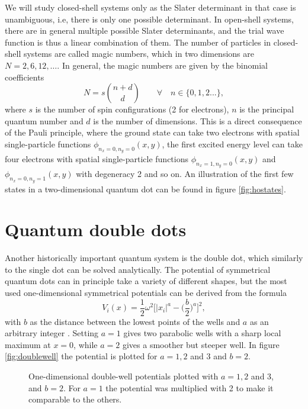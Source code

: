 We will study closed-shell systems only as the Slater determinant in that case is unambiguous, i.e, there is only one possible determinant. In open-shell systems, there are in general multiple possible Slater determinants, and the trial wave function is thus a linear combination of them. The number of particles in closed-shell systems are called magic numbers, which in two dimensions are $N=2,6,12,\hdots$. In general, the magic numbers are given by the binomial coefficients
\begin{equation}
N=s\binom{n+d}{d} \quad\quad\forall\quad n\in\{0,1,2...\},
\label{eq:HOclosedshell}
\end{equation}
where $s$ is the number of spin configurations (2 for electrons), $n$ is the principal quantum number and $d$ is the number of dimensions. This is a direct consequence of the Pauli principle, where the ground state can take two electrons with spatial single-particle functions $\phi_{n_x=0,n_y=0}(x,y)$, the first excited energy level can take four electrons with spatial single-particle functions $\phi_{n_x=1,n_y=0}(x,y)$ and $\phi_{n_x=0,n_y=1}(x,y)$ with degeneracy 2 and so on. An illustration of the first few states in a two-dimensional quantum dot can be found in figure \eqref{fig:hostates}.


%

\section{Quantum double dots} \label{sec:doubledots}
Another historically important quantum system is the double dot, which similarly to the single dot can be solved analytically. The potential of symmetrical quantum dots can in principle take a variety of different shapes, but the most used one-dimensional symmetrical potentials can be derived from the formula
\begin{equation}
V_i(x)=\frac{1}{2}\omega^2\bigg[|x_i|^a-\Big(\frac{b}{2}\Big)^a\bigg]^2,
\label{eq:doublewell}
\end{equation}
with $b$ as the distance between the lowest points of the wells and $a$ as an arbitrary integer \supercite{jelic_double_2012}. Setting $a=1$ gives two parabolic wells with a sharp local maximum at $x=0$, while $a=2$ gives a smoother but steeper well. In figure \eqref{fig:doublewell} the potential is plotted for $a=1,2$ and $3$ and $b=2$.

\begin{figure}
	\centering
	
	\caption{One-dimensional double-well potentials plotted with $a=1,2$ and 3, and $b=2$. For $a=1$ the potential was multiplied with 2 to make it comparable to the others. }
	\label{fig:doublewell}
\end{figure}

